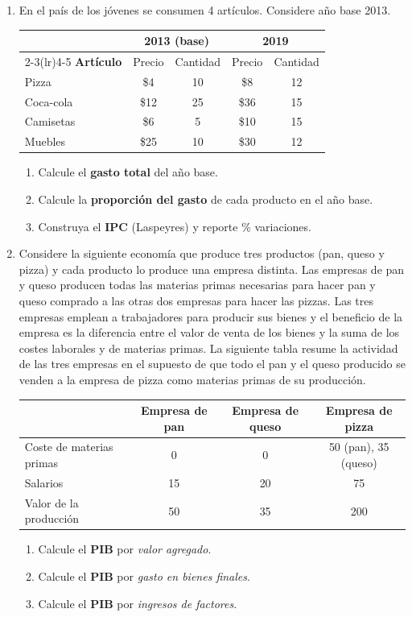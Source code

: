 \documentclass[11pt,addpoints]{article}
\begin{document}
\begin{enumerate}
\item En el país de los jóvenes se consumen 4 artículos. Considere año base 2013.
\begin{center}
\setlength{\tabcolsep}{8pt}
\begin{tabular}{lcccc}
\toprule
 & \multicolumn{2}{c}{\textbf{2013 (base)}} & \multicolumn{2}{c}{\textbf{2019}}\\
\cmidrule(lr){2-3}\cmidrule(lr){4-5}
\textbf{Artículo} & Precio & Cantidad & Precio & Cantidad\\
\midrule
Pizza & \$4 & 10 & \$8 & 12\\
Coca-cola & \$12 & 25 & \$36 & 15\\
Camisetas & \$6 & 5 & \$10 & 15\\
Muebles & \$25 & 10 & \$30 & 12\\
\bottomrule
\end{tabular}
\end{center}
\begin{enumerate}[label=(\alph*)]
\item Calcule el \textbf{gasto total} del año base.
\item Calcule la \textbf{proporción del gasto} de cada producto en el año base.
\newpage %
\vspace*{0.1cm} %
\item Construya el \textbf{IPC} (Laspeyres) y reporte \% variaciones.
\end{enumerate}

\item Considere la siguiente economía que produce tres productos (pan, queso y pizza) y cada
producto lo produce una empresa distinta. Las empresas de pan y queso producen todas las
materias primas necesarias para hacer pan y queso comprado a las otras dos empresas para hacer
las pizzas. Las tres empresas emplean a trabajadores para producir sus bienes y el beneficio de la
empresa es la diferencia entre el valor de venta de los bienes y la suma de los costes laborales y
de materias primas. La siguiente tabla resume la actividad de las tres empresas en el supuesto de
que todo el pan y el queso producido se venden a la empresa de pizza como materias primas de
su producción.
\begin{center}
\begin{tabular}{lccc}
\toprule
 & \textbf{Empresa de pan} & \textbf{Empresa de queso} & \textbf{Empresa de pizza}\\
\midrule
Coste de materias primas & 0 & 0 & 50 (pan), 35 (queso)\\
Salarios & 15 & 20 & 75\\
Valor de la producción & 50 & 35 & 200\\
\bottomrule
\end{tabular}
\end{center}
\begin{enumerate}[label=(\alph*)]
\item Calcule el \textbf{PIB} por \emph{valor agregado}.
\item Calcule el \textbf{PIB} por \emph{gasto en bienes finales}.
\item Calcule el \textbf{PIB} por \emph{ingresos de factores}.
\end{enumerate}


\end{enumerate}
\end{document}
